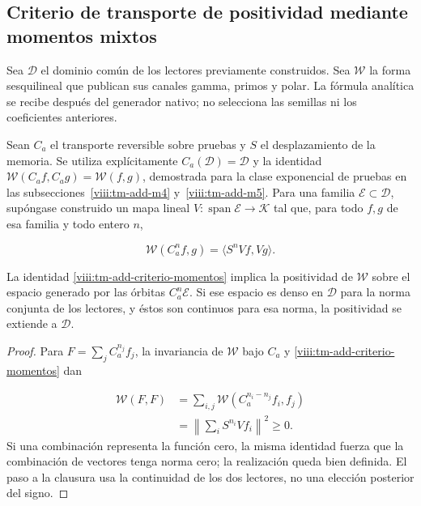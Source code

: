 \subsection{Criterio de transporte de positividad mediante momentos mixtos}
\label{viii:tm-add-c5}
Sea \(\mathcal D\) el dominio común de los lectores previamente construidos. Sea \(\mathscr W\) la forma sesquilineal que publican sus canales gamma, primos y polar. La fórmula analítica se recibe después del generador nativo; no selecciona las semillas ni los coeficientes anteriores.

Sean \(C_a\) el transporte reversible sobre pruebas y \(S\) el desplazamiento de la memoria. Se utiliza explícitamente \(C_a(\mathcal D)=\mathcal D\) y la identidad \(\mathscr W(C_af,C_ag)=\mathscr W(f,g)\), demostrada para la clase exponencial de pruebas en las subsecciones~\ref{viii:tm-add-m4} y~\ref{viii:tm-add-m5}. Para una familia \(\mathcal E\subset\mathcal D\), supóngase construido un mapa lineal \(V:\operatorname{span}\mathcal E\to\mathcal K\) tal que, para todo \(f,g\) de esa familia y todo entero \(n\),

\begin{equation}
\boxed{\mathscr W(C_a^n f,g)=\langle S^nVf,Vg\rangle.}
\label{viii:tm-add-criterio-momentos}
\end{equation}
\begin{proposition}
\label{viii:tm-add-proposicion-costura-3}
La identidad \eqref{viii:tm-add-criterio-momentos} implica la positividad de \(\mathscr W\) sobre el espacio generado por las órbitas \(C_a^n\mathcal E\). Si ese espacio es denso en \(\mathcal D\) para la norma conjunta de los lectores, y éstos son continuos para esa norma, la positividad se extiende a \(\mathcal D\).
\end{proposition}

\begin{proof}
Para \(F=\sum_j C_a^{n_j}f_j\), la invariancia de \(\mathscr W\) bajo \(C_a\) y \eqref{viii:tm-add-criterio-momentos} dan

\[
\begin{aligned}
\mathscr W(F,F)
&=\sum_{i,j}\mathscr W(C_a^{n_i-n_j}f_i,f_j)\\
&=\left\|\sum_i S^{n_i}Vf_i\right\|^2\geq0.
\end{aligned}
\]
Si una combinación representa la función cero, la misma identidad fuerza que la combinación de vectores tenga norma cero; la realización queda bien definida. El paso a la clausura usa la continuidad de los dos lectores, no una elección posterior del signo.
\end{proof}

